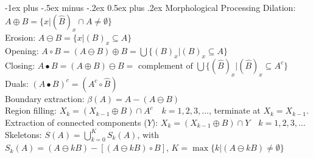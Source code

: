 \documentclass[dvipdfmx,a4paper,10pt,landscape]{article}
\makeatletter
\renewcommand{\section}{\@startsection{section}{1}{0mm}%
                                {-1ex plus -.5ex minus -.2ex}%
                                {0.5ex plus .2ex}%
                                {\normalfont\large\bfseries}}
\makeatother
\begin{document}
\begin{multicols}{3}
    \section{Morphological Processing}
    Dilation: $A \oplus B=\{x\vert (\hat{B})_x\cap A \neq \emptyset\}$ \\
    Erosion: $A \ominus B =\{x\vert (B)_x \subseteq A\}$ \\
    Opening: $A \circ B = (A \ominus B) \oplus B=\bigcup\{(B)_x\vert(B)_x\subseteq A\}$ \\
    Closing: $A \bullet B = (A \oplus B) \ominus B = \text{ complement of } \bigcup\{(\hat{B})_x\vert(\hat{B})_x\subseteq A^c\}$ \\
    Duals: $(A\bullet B)^c=(A^c \circ \hat{B})$\\
    Boundary extraction: $\beta(A)=A-(A\ominus B)$\\
    Region filling: $X_k=(X_{k-1}\oplus B)\cap A^c\quad k=1,2,3,\ldots$, terminate at $X_k=X_{k-1}$.\\
    Extraction of connected components ($Y$): $X_k=(X_{k-1}\oplus B)\cap Y\quad k=1,2,3,\ldots$\\
    Skeletons: $S(A)=\bigcup_{k=0}^K S_k(A)$, with $S_k(A)=(A \ominus kB)-[(A \ominus kB)\circ B]$, $K=\max\{k\vert (A \ominus kB)\neq \emptyset\}$
\end{multicols}
\end{document}
